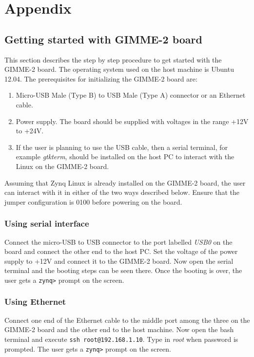 \section{Appendix}
\subsection{Getting started with GIMME-2 board}\label{sec:first_appendix}
This section describes the step by step procedure to get started with the GIMME-2 board. The operating system used on the host machine is Ubuntu 12.04. The prerequisites for initializing the GIMME-2 board are:\begin{enumerate}
\item Micro-USB Male (Type B) to USB Male (Type A) connector or an Ethernet cable.
\item Power supply. The board should be supplied with voltages in the range +12V to +24V.
\item If the user is planning to use the USB cable, then a serial terminal, for example \textit{gtkterm}, should be installed on the host PC to interact with the Linux on the GIMME-2 board.
\end{enumerate}

Assuming that Zynq Linux is already installed on the GIMME-2 board, the user can interact with it in either of the two ways described below. Ensure that the jumper configuration is 0100 before powering on the board.
\subsubsection{Using serial interface}
Connect the micro-USB to USB connector to the port labelled \textit{USB0} on the board and connect the other end to the host PC. Set the voltage of the power supply to +12V and connect it to the GIMME-2 board. Now open the serial terminal and the booting steps can be seen there. Once the booting is over, the user gets a \texttt{zynq>} prompt on the screen.

\subsubsection{Using Ethernet}
Connect one end of the Ethernet cable to the middle port among the three on the GIMME-2 board and the other end to the host machine. Now open the bash terminal and execute
\texttt{ssh root@192.168.1.10}. Type in \textit{root} when password is prompted. The user gets a \texttt{zynq>} prompt on the screen.

